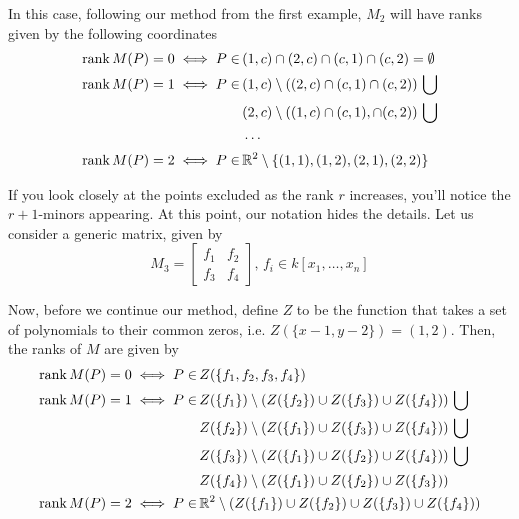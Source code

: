 \documentclass{amsart}
\theoremstyle{definition}
\theoremstyle{remark}
\DeclareMathOperator{\rank}{rank}
\numberwithin{equation}{section}
\begin{document}
In this case, following our method from the first example, $M_2$ will have ranks given by the following coordinates
\begin{align}
  \rank M(P) = 0 \iff P \in &\, (1, c) \cap (2, c) \cap (c, 1) \cap (c, 2) = \emptyset\\
  \rank M(P) = 1 \iff P \in &\, (1, c) \setminus ((2, c) \cap (c, 1) \cap (c, 2)) \, \bigcup \\
  &\, (2, c) \setminus ((1, c) \cap (c, 1), \cap (c, 2)) \, \bigcup \notag\\
  &\, \cdots \notag \\
  \rank M(P) = 2 \iff P \in &\, \mathbb{R}^2 \setminus \{ (1, 1), (1, 2), (2, 1), (2, 2) \}
\end{align}

If you look closely at the points excluded as the rank $r$ increases, you'll notice the $r + 1$-minors appearing. At this point, our notation hides the details. Let us consider a generic matrix, given by
\begin{equation}
  \label{eq:introduction-generic-matrix}
  M_3 = \begin{bmatrix}
    f_1 & f_2\\
    f_3 & f_4
  \end{bmatrix}
  \text{, } f_i \in k[x_1, \ldots, x_n]
\end{equation}

Now, before we continue our method, define $Z$ to be the function that takes a set of polynomials to their common zeros, i.e. $Z(\{ x - 1, y - 2 \}) = (1, 2)$. Then, the ranks of $M$ are given by
\begin{align}
  \rank M(P) = 0 \iff P \in &\, Z(\{ f_1, f_2, f_3, f_4 \})\\
  \rank M(P) = 1 \iff P \in &\, Z(\{ f_1 \}) \setminus \left( Z(\{ f_2 \}) \cup Z(\{ f_3 \}) \cup Z(\{ f_4 \}) \right) \, \bigcup \\
  &\, Z(\{ f_2 \}) \setminus \left( Z(\{ f_1 \}) \cup Z(\{ f_3 \}) \cup Z(\{ f_4 \}) \right) \, \bigcup \notag\\
  &\, Z(\{ f_3 \}) \setminus \left( Z(\{ f_1 \}) \cup Z(\{ f_2 \}) \cup Z(\{ f_4 \}) \right) \, \bigcup \notag\\
  &\, Z(\{ f_4 \}) \setminus \left( Z(\{ f_1 \}) \cup Z(\{ f_2 \}) \cup Z(\{ f_3 \}) \right) \notag\\
  \rank M(P) = 2 \iff P \in &\, \mathbb{R}^2 \setminus \left( Z(\{ f_1\}) \cup Z(\{ f_2\}) \cup Z(\{f_3\}) \cup Z(\{f_4 \}) \right)
\end{align}
\end{document}
